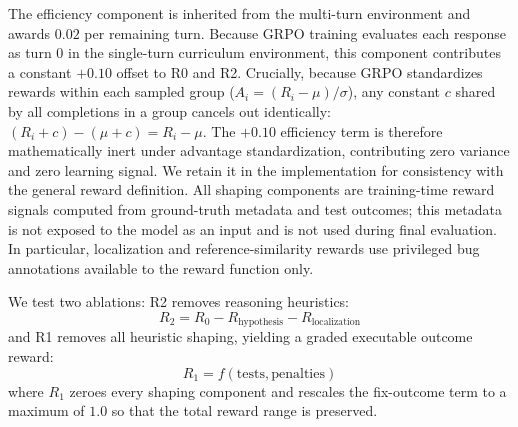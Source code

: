 \documentclass{article}
\begin{document}
The efficiency component is inherited from the multi-turn environment and awards $0.02$ per remaining turn. Because GRPO training evaluates each response as turn 0 in the single-turn curriculum environment, this component contributes a constant $+0.10$ offset to R0 and R2. Crucially, because GRPO standardizes rewards within each sampled group ($A_i = (R_i - \mu)/\sigma$), any constant $c$ shared by all completions in a group cancels out identically: $(R_i + c) - (\mu + c) = R_i - \mu$. The $+0.10$ efficiency term is therefore mathematically inert under advantage standardization, contributing zero variance and zero learning signal. We retain it in the implementation for consistency with the general reward definition. All shaping components are training-time reward signals computed from ground-truth metadata and test outcomes; this metadata is not exposed to the model as an input and is not used during final evaluation. In particular, localization and reference-similarity rewards use privileged bug annotations available to the reward function only.

We test two ablations: R2 removes reasoning heuristics:
\begin{equation}
R_2 = R_0 - R_{\text{hypothesis}} - R_{\text{localization}}
\end{equation}
and R1 removes all heuristic shaping, yielding a graded executable outcome reward:
\begin{equation}
R_1 = f(\text{tests}, \text{penalties})
\end{equation}
where $R_1$ zeroes every shaping component and rescales the fix-outcome term to a maximum of $1.0$ so that the total reward range is preserved.
\end{document}
